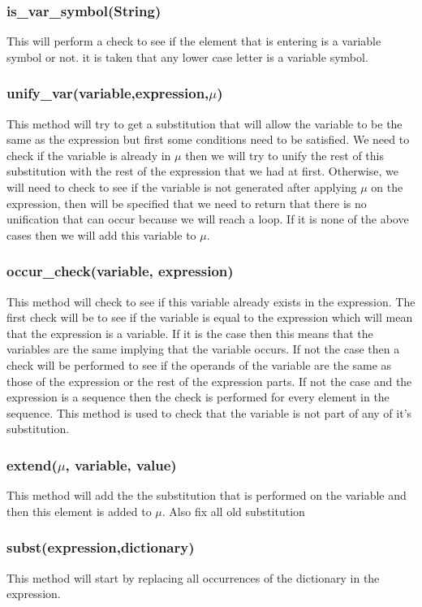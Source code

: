 {\subsubsection{is\_var\_symbol(String)}
This will perform a check to see if the element that is entering is a variable symbol or not. it is taken that any lower case letter is a variable symbol.

\subsubsection{unify\_var(variable,expression,$\mu$)}
This method will try to get a substitution that will allow the variable to be the same as the expression but first some conditions need to be satisfied. We need to check if the variable is already in $\mu$ then we will try to unify the rest of this substitution with the rest of the expression that we had at first. Otherwise, we will need to check to see if the variable is not generated after applying $\mu$ on the expression, then will be specified that we need to return that there is no unification that can occur because we will reach a loop. If it is none of the above cases then we will add this variable to $\mu$.
\subsubsection{occur\_check(variable, expression)}
This method will check to see if this variable already exists in the expression. The first check will be to see if the variable is equal to the expression which will mean that the expression is a variable. If it is the case then this means that the variables are the same implying that the variable occurs. If not the case then a check will be performed to see if the operands of the variable are the same as those of the expression or the rest of the expression parts. If not the case and the expression is a sequence then the check is performed for every element in the sequence. This method is used to check that the variable is not part of any of it's substitution.
\subsubsection{extend($\mu$, variable, value) }
This method will add the the substitution that is performed on the variable and then this element is added to $\mu$. Also fix all old substitution
\subsubsection{subst(expression,dictionary)}
This method will start by replacing all occurrences of the dictionary in the expression.

}
